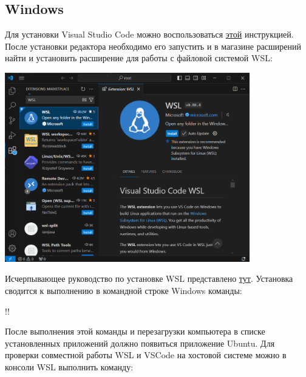 \documentclass[14pt]{extarticle}
\begin{document}
\subsection{Windows}

Для установки Visual Studio Code можно воспользоваться
\href{https://code.visualstudio.com/docs/setup/windows#_installation}{этой}
инструкцией.
После установки редактора необходимо его запустить и в магазине расширений найти и установить
расширение для работы с файловой системой WSL:

\vspace{2mm}

\begin{center}
    \includegraphics[width=0.8\textwidth]{Homeworks/1-Hello-World/wsl-extension.png}
\end{center}

\vspace{2mm}

Исчерпывающее руководство по установке WSL представлено
\href{https://learn.microsoft.com/ru-ru/windows/wsl/setup/environment}{тут}.
Установка сводится к выполнению в командной строке Windows команды:

\vspace{2mm}

\begin{consolewindow}[\normalsize]
!!
\end{consolewindow}

\vspace{2mm}

После выполнения этой команды и перезагрузки компьютера в списке установленных приложений
должно появиться приложение Ubuntu.
Для проверки совместной работы WSL и VSCode на хостовой системе можно в консоли WSL выполнить
команду:
\end{document}
